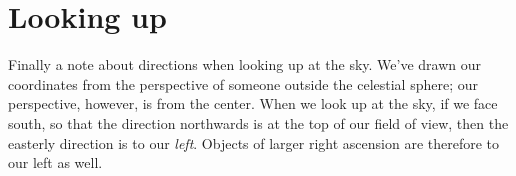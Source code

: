 \section{Looking up}
Finally a note about directions when looking up at the sky.  We've drawn our coordinates from the perspective of someone outside the celestial sphere; our perspective, however, is from the center.  When we look up at the sky, if we face south, so that the direction northwards is at the top of our field of view, then the easterly direction is to our \emph{left}. Objects of larger right ascension are therefore to our left as well.
